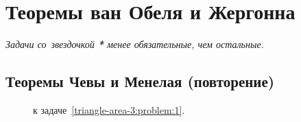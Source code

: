 
\section*{Теоремы ван Обеля и Жергонна}



\emph{Задачи со~звездочкой \textbf{*} менее обязательные, чем остальные.}


\subsection*{Теоремы Чевы и Менелая (повторение)}

\begin{figure}[hb]
\begin{center}
    \caption{к задаче~\ref{triangle-area-3:problem:1}.}
    \label{triangle-area-3:problem:1:fig}
\end{center}
\end{figure}

